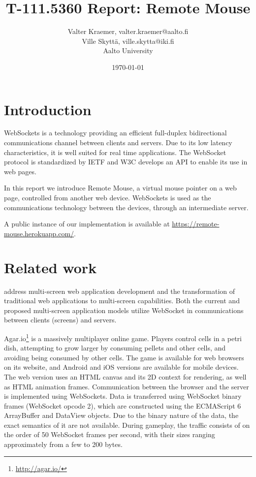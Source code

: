 \documentclass[a4paper,english,twocolumn]{article}
\begin{document}
\title{T-111.5360 Report: Remote Mouse}

\author{Valter Kraemer, valter.kraemer@aalto.fi\\Ville Skyttä, ville.skytta@iki.fi\\Aalto University}

\date{\today}

\maketitle


\section{Introduction}

WebSockets is a technology providing an efficient full-duplex
bidirectional communications channel between clients and servers. Due
to its low latency characteristics, it is well suited for real time
applications. The WebSocket protocol is standardized by IETF
\citep{rfc} and W3C \citep{w3c} develops an API to enable its use in
web pages.

In this report we introduce Remote Mouse, a virtual mouse pointer on a
web page, controlled from another web device. WebSockets is used as
the communications technology between the devices, through an
intermediate server.

A public instance of our implementation is available
at \url{https://remote-mouse.herokuapp.com/}.

\section{Related work}

\citet{bassbouss} address multi-screen web application development and
the transformation of traditional web applications to multi-screen
capabilities. Both the current and proposed multi-screen application
models utilize WebSocket in communications between clients (screens)
and servers.

Agar.io\footnote{\url{http://agar.io/}} is a massively multiplayer
online game. Players control cells in a petri dish, attempting to grow
larger by consuming pellets and other cells, and avoiding being
consumed by other cells. The game is available for web browsers on its
website, and Android and iOS versions are available for mobile
devices. The web version uses an HTML canvas and its 2D context for
rendering, as well as HTML animation frames. Communication between the
browser and the server is implemented using WebSockets. Data is
transferred using WebSocket binary frames (WebSocket opcode 2), which
are constructed using the ECMAScript 6 ArrayBuffer and DataView
objects. Due to the binary nature of the data, the exact semantics of
it are not available. During gameplay, the traffic consists of on the
order of 50 WebSocket frames per second, with their sizes ranging
approximately from a few to 200 bytes.
\end{document}
